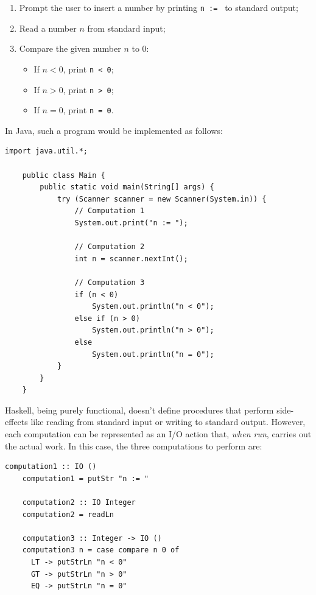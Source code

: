 \documentclass[UdineBachThesis,american,11pt]{PhdThesis}
\begin{document}
  \begin{enumerate}
    \item Prompt the user to insert a number by printing \mbox{\texttt{n :=\ }}
    to standard output;

    \item Read a number $n$ from standard input;

    \item Compare the given number $n$ to $0$:

    \begin{itemize}[noitemsep]
      \item If \mbox{$n < 0$}, print \mbox{\texttt{n < 0}};
      \item If \mbox{$n > 0$}, print \mbox{\texttt{n > 0}};
      \item If \mbox{$n = 0$}, print \mbox{\texttt{n = 0}}.
    \end{itemize}
  \end{enumerate}

  In Java, such a program would be implemented as follows:

  \begin{Verbatim}[gobble=4,fontsize=\small]
    import java.util.*;

    public class Main {
        public static void main(String[] args) {
            try (Scanner scanner = new Scanner(System.in)) {
                // Computation 1
                System.out.print("n := ");

                // Computation 2
                int n = scanner.nextInt();

                // Computation 3
                if (n < 0)
                    System.out.println("n < 0");
                else if (n > 0)
                    System.out.println("n > 0");
                else
                    System.out.println("n = 0");
            }
        }
    }
  \end{Verbatim}

  Haskell, being purely functional, doesn't define procedures that perform
  side-effects like reading from standard input or writing to standard output.
  However, each computation can be represented as an I/O action that, \emph{when
  run}, carries out the actual work. In this case, the three computations to
  perform are:

  \begin{Verbatim}[gobble=4,fontsize=\small]
    computation1 :: IO ()
    computation1 = putStr "n := "

    computation2 :: IO Integer
    computation2 = readLn

    computation3 :: Integer -> IO ()
    computation3 n = case compare n 0 of
      LT -> putStrLn "n < 0"
      GT -> putStrLn "n > 0"
      EQ -> putStrLn "n = 0"
  \end{Verbatim}
\end{document}
